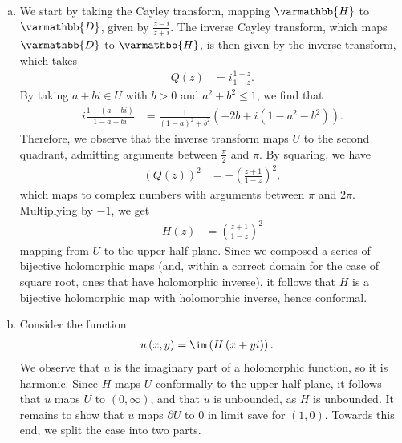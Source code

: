 \documentclass[10pt]{mypackage}
\renewcommand*{\mathbb}[1]{\varmathbb{#1}}
\begin{document}
\begin{solution}\hfill
  \begin{enumerate}[(a)]
    \item We start by taking the Cayley transform, mapping $ \mathbb{H} $ to $ \mathbb{D} $, given by $\frac{z-i}{z+i}$. The inverse Cayley transform, which maps $ \mathbb{D} $ to $ \mathbb{H} $, is then given by the inverse transform, which takes
      \begin{align*}
        Q(z) &= i\frac{1+z}{1-z}.
      \end{align*}
      By taking $a + bi\in U$ with $b > 0$ and $a^2 + b^2 \leq 1$, we find that
      \begin{align*}
        i\frac{1 + \left( a + bi \right)}{1-a-bi} &= \frac{1}{\left( 1-a \right)^2 + b^2} \left( -2b + i\left( 1-a^2-b^2 \right) \right).
      \end{align*}
      Therefore, we observe that the inverse transform maps $U$ to the second quadrant, admitting arguments between $\frac{\pi}{2}$ and $\pi$. By squaring, we have
      \begin{align*}
        \left( Q(z) \right)^2 &= -\left( \frac{z+1}{1-z} \right)^2,
      \end{align*}
      which maps to complex numbers with arguments between $\pi$ and $2\pi$. Multiplying by $-1$, we get
      \begin{align*}
        H(z) &= \left( \frac{z+1}{1-z} \right)^2
      \end{align*}
      mapping from $U$ to the upper half-plane. Since we composed a series of bijective holomorphic maps (and, within a correct domain for the case of square root, ones that have holomorphic inverse), it follows that $H$ is a bijective holomorphic map with holomorphic inverse, hence conformal.
    \item Consider the function
      \begin{align*}
        u\left( x,y \right) &= \im\left( H\left( x + yi \right) \right).
      \end{align*}
      We observe that $u$ is the imaginary part of a holomorphic function, so it is harmonic. Since $H$ maps $U$ conformally to the upper half-plane, it follows that $u$ maps $U$ to $\left( 0,\infty \right)$, and that $u$ is unbounded, as $H$ is unbounded. It remains to show that $u$ maps $\partial U$ to $0$ in limit save for $\left( 1,0 \right)$. Towards this end, we split the case into two parts.\newline


\end{enumerate}
\end{solution}
\end{document}
